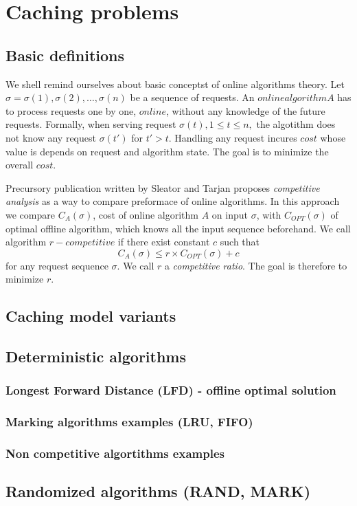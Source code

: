 \section{Caching problems}

\subsection{Basic definitions}
We shell remind ourselves about basic conceptst of online algorithms theory. 
Let $\sigma = \sigma(1), \sigma(2), \ldots, \sigma(n)$ be a sequence of 
requests. An $online algorithm A$ has to process requests one by one, $online$, 
without any knowledge of the future requests. Formally, when serving request 
$\sigma(t), 1 \leq t \leq n,$ the algotithm does not know any request 
$\sigma(t')$ for $t'>t$. Handling any request incures $cost$ whose value is 
depends on request and algorithm state. The goal is to minimize the overall 
$cost$.

Precursory publication written by Sleator and Tarjan proposes 
\textit{competitive analysis} as a way to compare preformace of online 
algorithms. In this approach we compare $C_A(\sigma)$, cost of online algorithm 
$A$ on input $\sigma$, with $C_{OPT}(\sigma)$ of optimal offline algorithm, 
which knows all the input sequence beforehand. We call algorithm $r-competitive$ 
if there exist constant $c$ such that
$$C_A(\sigma) \leq r \times C_{OPT}(\sigma) + c$$
for any request sequence $\sigma$. We call $r$ a \textit{competitive ratio}. 
The goal is therefore to minimize $r$.
\subsection{Caching model variants}

\subsection{Deterministic algorithms}
\subsubsection{Longest Forward Distance (LFD) - offline optimal solution}
\subsubsection{Marking algorithms examples (LRU, FIFO)}
\subsubsection{Non competitive algortithms examples}

\subsection{Randomized algorithms (RAND, MARK)}